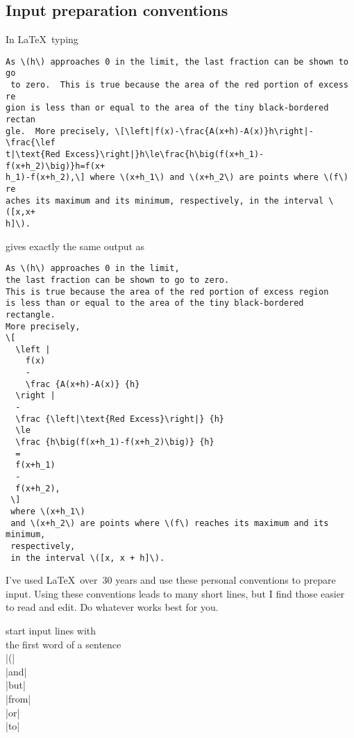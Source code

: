 
\subsection{Input preparation conventions}

In \LaTeX\ typing

\begin{verbatim}
As \(h\) approaches 0 in the limit, the last fraction can be shown to go
 to zero.  This is true because the area of the red portion of excess re
gion is less than or equal to the area of the tiny black-bordered rectan
gle.  More precisely, \[\left|f(x)-\frac{A(x+h)-A(x)}h\right|-\frac{\lef
t|\text{Red Excess}\right|}h\le\frac{h\big(f(x+h_1)-f(x+h_2)\big)}h=f(x+
h_1)-f(x+h_2),\] where \(x+h_1\) and \(x+h_2\) are points where \(f\) re
aches its maximum and its minimum, respectively, in the interval \([x,x+
h]\).
\end{verbatim}

gives exactly the same output as

\begin{verbatim}
As \(h\) approaches 0 in the limit,
the last fraction can be shown to go to zero.
This is true because the area of the red portion of excess region
is less than or equal to the area of the tiny black-bordered rectangle.
More precisely,
\[
  \left |
    f(x)
    -
    \frac {A(x+h)-A(x)} {h}
  \right |
  -
  \frac {\left|\text{Red Excess}\right|} {h}
  \le
  \frac {h\big(f(x+h_1)-f(x+h_2)\big)} {h}
  =
  f(x+h_1)
  -
  f(x+h_2),
 \]
 where \(x+h_1\)
 and \(x+h_2\) are points where \(f\) reaches its maximum and its minimum,
 respectively,
 in the interval \([x, x + h]\).
\end{verbatim}


I've used \LaTeX\ over~30 years
and use these personal conventions
to prepare input.
Using these conventions leads
to many short lines,
but I find those easier
to read and edit.
Do whatever works best for you.

 start input lines with\\
   the first word of a sentence\\
   |(|\\
   |and|\\
   |but|\\
   |from|\\
   |or|\\
   |to|

